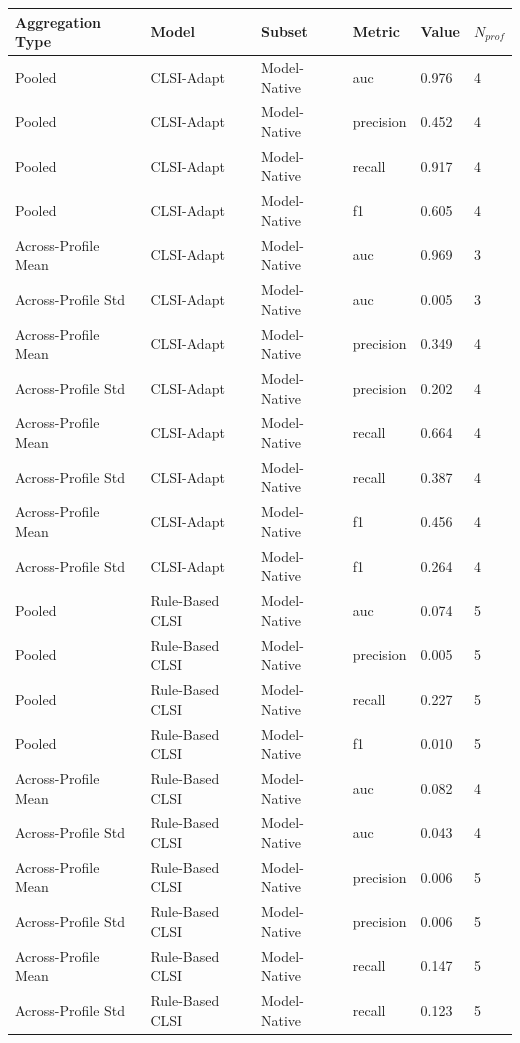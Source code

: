 \begin{table}[ht]
\centering
\begin{tabular}{llllll}
\toprule
Aggregation Type & Model & Subset & Metric & Value & $N_{prof}$ \\
\midrule
Pooled & CLSI-Adapt & Model-Native & auc & 0.976 & 4 \\
Pooled & CLSI-Adapt & Model-Native & precision & 0.452 & 4 \\
Pooled & CLSI-Adapt & Model-Native & recall & 0.917 & 4 \\
Pooled & CLSI-Adapt & Model-Native & f1 & 0.605 & 4 \\
Across-Profile Mean & CLSI-Adapt & Model-Native & auc & 0.969 & 3 \\
Across-Profile Std & CLSI-Adapt & Model-Native & auc & 0.005 & 3 \\
Across-Profile Mean & CLSI-Adapt & Model-Native & precision & 0.349 & 4 \\
Across-Profile Std & CLSI-Adapt & Model-Native & precision & 0.202 & 4 \\
Across-Profile Mean & CLSI-Adapt & Model-Native & recall & 0.664 & 4 \\
Across-Profile Std & CLSI-Adapt & Model-Native & recall & 0.387 & 4 \\
Across-Profile Mean & CLSI-Adapt & Model-Native & f1 & 0.456 & 4 \\
Across-Profile Std & CLSI-Adapt & Model-Native & f1 & 0.264 & 4 \\
Pooled & Rule-Based CLSI & Model-Native & auc & 0.074 & 5 \\
Pooled & Rule-Based CLSI & Model-Native & precision & 0.005 & 5 \\
Pooled & Rule-Based CLSI & Model-Native & recall & 0.227 & 5 \\
Pooled & Rule-Based CLSI & Model-Native & f1 & 0.010 & 5 \\
Across-Profile Mean & Rule-Based CLSI & Model-Native & auc & 0.082 & 4 \\
Across-Profile Std & Rule-Based CLSI & Model-Native & auc & 0.043 & 4 \\
Across-Profile Mean & Rule-Based CLSI & Model-Native & precision & 0.006 & 5 \\
Across-Profile Std & Rule-Based CLSI & Model-Native & precision & 0.006 & 5 \\
Across-Profile Mean & Rule-Based CLSI & Model-Native & recall & 0.147 & 5 \\
Across-Profile Std & Rule-Based CLSI & Model-Native & recall & 0.123 & 5 \\

\end{tabular}
\end{table}
